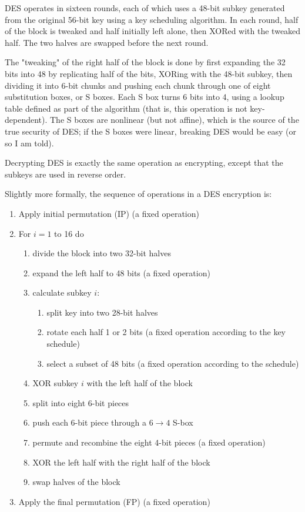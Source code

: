 \documentclass[%
 aip,
 jmp,%
 amsmath,amssymb,
 reprint,%
]{revtex4-1}
\begin{document}
DES operates in sixteen rounds, each of which uses a 48-bit subkey
generated from the original 56-bit key using a key scheduling
algorithm.  In each round, half of the block is tweaked and half
initially left alone, then XORed with the tweaked half.  The two
halves are swapped before the next round.

The "tweaking" of the right half of the block is done by first
expanding the 32 bits into 48 by replicating half of the bits, XORing
with the 48-bit subkey, then dividing it into 6-bit chunks and pushing
each chunk through one of eight substitution boxes, or S boxes.  Each
S box turns 6 bits into 4, using a lookup table defined as part of the
algorithm (that is, this operation is not key-dependent).  The S boxes
are nonlinear (but not affine), which is the source of the true
security of DES; if the S boxes were linear, breaking DES would be
easy (or so I am told).

Decrypting DES is exactly the same operation as encrypting, except
that the subkeys are used in reverse order.

Slightly more formally, the sequence of operations in a DES encryption
is:

\begin{enumerate}
\item Apply initial permutation (IP) (a fixed operation)
\item For $i = 1$ to 16 do
  \begin{enumerate}
  \item divide the block into two 32-bit halves
  \item expand the left half to 48 bits (a fixed operation)
  \item calculate subkey $i$:
    \begin{enumerate}
    \item split key into two 28-bit halves
    \item rotate each half 1 or 2 bits (a fixed operation according to
      the key schedule)
    \item select a subset of 48 bits (a fixed operation according to
      the schedule)
    \end{enumerate}
  \item XOR subkey $i$ with the left half of the block
  \item split into eight 6-bit pieces
  \item push each 6-bit piece through a $6\rightarrow 4$ S-box
  \item permute and recombine the eight 4-bit pieces (a fixed operation)
  \item XOR the left half with the right half of the block
  \item swap halves of the block
  \end{enumerate}
\item Apply the final permutation (FP) (a fixed operation)
\end{enumerate}
\end{document}
